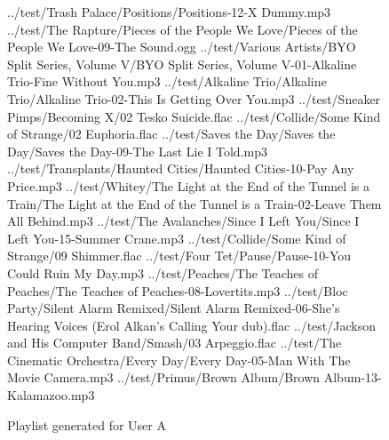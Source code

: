 \begin{figure}[ht]
	\caption{Playlist generated for User A}
	\label{fig:testing:user:playlist:a}
	\begin{listing}{1}
../test/Trash Palace/Positions/Positions-12-X Dummy.mp3
../test/The Rapture/Pieces of the People We Love/Pieces of the People We Love-09-The Sound.ogg
../test/Various Artists/BYO Split Series, Volume V/BYO Split Series, Volume V-01-Alkaline Trio-Fine Without You.mp3
../test/Alkaline Trio/Alkaline Trio/Alkaline Trio-02-This Is Getting Over You.mp3
../test/Sneaker Pimps/Becoming X/02 Tesko Suicide.flac
../test/Collide/Some Kind of Strange/02 Euphoria.flac
../test/Saves the Day/Saves the Day/Saves the Day-09-The Last Lie I Told.mp3
../test/Transplants/Haunted Cities/Haunted Cities-10-Pay Any Price.mp3
../test/Whitey/The Light at the End of the Tunnel is a Train/The Light at the End of the Tunnel is a Train-02-Leave Them All Behind.mp3
../test/The Avalanches/Since I Left You/Since I Left You-15-Summer Crane.mp3
../test/Collide/Some Kind of Strange/09 Shimmer.flac
../test/Four Tet/Pause/Pause-10-You Could Ruin My Day.mp3
../test/Peaches/The Teaches of Peaches/The Teaches of Peaches-08-Lovertits.mp3
../test/Bloc Party/Silent Alarm Remixed/Silent Alarm Remixed-06-She's Hearing Voices (Erol Alkan's Calling Your dub).flac
../test/Jackson and His Computer Band/Smash/03 Arpeggio.flac
../test/The Cinematic Orchestra/Every Day/Every Day-05-Man With The Movie Camera.mp3
../test/Primus/Brown Album/Brown Album-13-Kalamazoo.mp3
\end{listing}
\end{figure}
